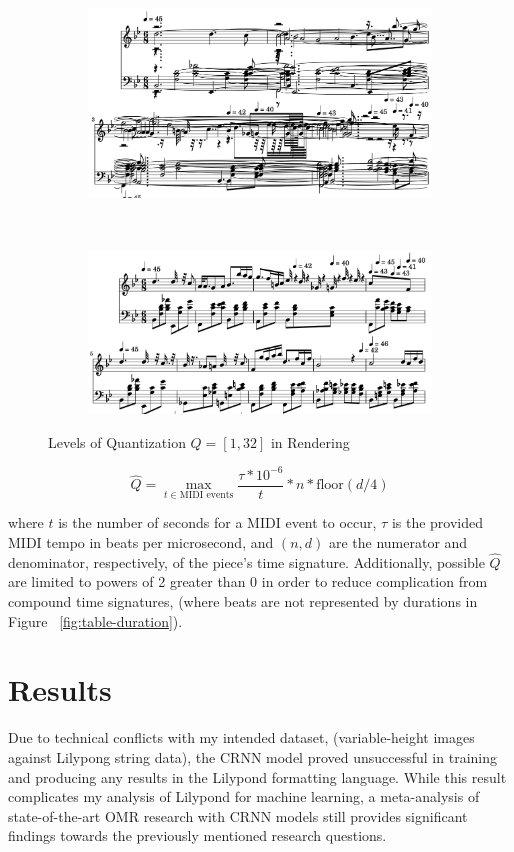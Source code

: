 \documentclass[nonacm, sigconf]{acmart}
\begin{document}
\begin{figure}
	\centering
	\begin{subfigure}
		\centering
		\includegraphics[width = .8\linewidth]{./figures/c1.png}
	\end{subfigure}
	~
	\begin{subfigure}
		\centering
		\includegraphics[width = .8\linewidth]{./figures/c32.png}
	\end{subfigure}
	\caption{Levels of Quantization $Q = [1, 32]$ in Rendering}
	\label{fig:quantization}
\end{figure}

\begin{equation}
	\hat Q = \max_{t\in \text{MIDI events}} \frac{\tau * 10^{-6}}{t} * n * \text{floor}(d / 4)
\end{equation}

where $t$ is the number of seconds for a MIDI event to occur, $\tau$ is the provided MIDI tempo in beats per microsecond, and $(n, d)$ are the numerator and denominator, respectively, of the piece's time signature.
Additionally, possible $\hat Q$ are limited to powers of 2 greater than 0 in order to reduce complication from compound time signatures, (where beats are not represented by durations in Figure ~\ref{fig:table-duration}).


\section{Results}
Due to technical conflicts with my intended dataset, (variable-height images against Lilypong string data),
 the CRNN model proved unsuccessful in training and producing any results in the Lilypond formatting language.
While this result complicates my analysis of Lilypond for machine learning, a meta-analysis of state-of-the-art OMR research with CRNN models still provides significant findings towards the previously mentioned research questions.  
\end{document}
